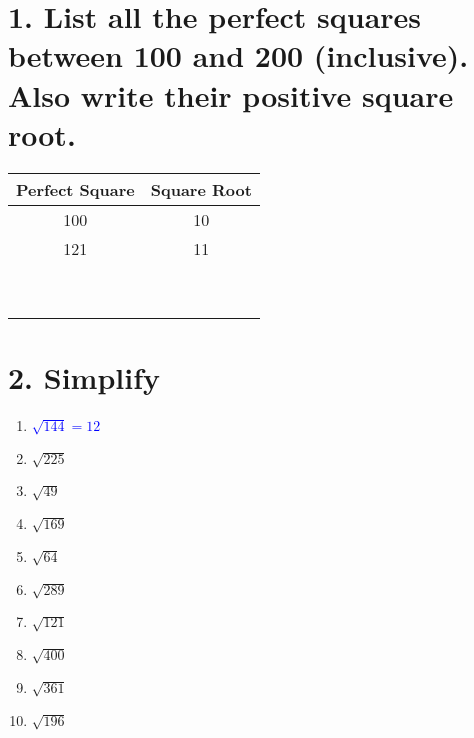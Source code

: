 \documentclass[12pt]{article}
\newcommand{\studentsmallworkspace}{\vspace{0.7cm}}
\begin{document}
\section*{\normalsize 1. List all the perfect squares between 100 and 200 (inclusive). Also write their positive square root.}
\renewcommand{\arraystretch}{2} %
\begin{center}
\begin{tabular}{|c|c|}
    \hline
    Perfect Square & Square Root \\
    \hline
    100 & 10 \\
    \hline
    121 & 11 \\
    \hline
    & \\
    \hline
    & \\
    \hline
    & \\
    \hline
    & \\
    \hline
    & \\
    \hline
    & \\
    \hline
    & \\
    \hline
    & \\
    \hline
    & \\
    \hline
\end{tabular}
\end{center}


\section*{\normalsize 2. Simplify}
\begin{enumerate}[label=\alph*.]
    \item \textcolor{blue}{$\sqrt{144} = 12$}
        \studentsmallworkspace
    \item $\sqrt{225}$
        \studentsmallworkspace
    \item $\sqrt{49}$
        \studentsmallworkspace
    \item $\sqrt{169}$
        \studentsmallworkspace
    \item $\sqrt{64}$
        \studentsmallworkspace
    \item $\sqrt{289}$
        \studentsmallworkspace
    \item $\sqrt{121}$
        \studentsmallworkspace
    \item $\sqrt{400}$
        \studentsmallworkspace
    \item $\sqrt{361}$
        \studentsmallworkspace
    \item $\sqrt{196}$
        \studentsmallworkspace
\end{enumerate}
\end{document}
